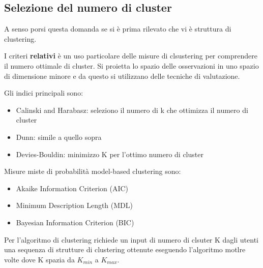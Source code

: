 \subsection{Selezione del numero di cluster}
A senso porsi questa domanda se si \`e prima rilevato che vi \`e struttura di clustering. 

I criteri \textbf{relativi} \`e un uso particolare delle misure di clsustering per comprendere il numero ottimale di cluster. Si proietta lo spazio delle osservazioni in uno spazio di dimensione minore e da questo si utilizzano delle tecniche di valutazione.

Gli indici principali sono:
\begin{itemize}
	\item Calinski and Harabasz: seleziono il numero di k che ottimizza il numero di cluster
	\item Dunn: simile a quello sopra
	\item Devies-Bouldin: minimizzo K per l'ottimo numero di cluster
\end{itemize}

Misure miste di probabilit\`a model-based clustering sono:
\begin{itemize}
	\item Akaike Information Criterion (AIC)
	\item Minimum Description Length (MDL)
	\item Bayesian Information Criterion (BIC)
\end{itemize}

Per l'algoritmo di clustering richiede un input di numero di clsuter K dagli utenti una sequenza di strutture di clustering ottenute eseguendo l'algoritmo motlre volte dove K spazia da $K_{min}$ a $K_{max}$.